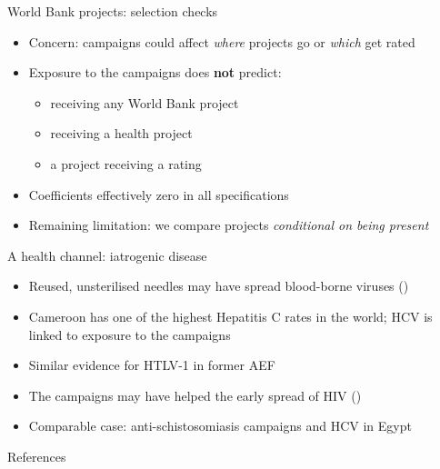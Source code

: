 \documentclass[aspectratio=1610]{beamer}
\newcommand{\refs}[1]{{\footnotesize\color{softgray}(\citealp{#1})}} %
\newcommand{\returnbutton}[1]{\par\vfill\hfill\hyperlink{#1}{\beamerreturnbutton{Back}}}
\begin{document}
\begin{frame}[label=bk-wb]{World Bank projects: selection checks}
  \begin{itemize}
    \item Concern: campaigns could affect \emph{where} projects go or \emph{which} get rated
    \item Exposure to the campaigns does \textbf{not} predict:
      \begin{itemize}
        \item receiving any World Bank project
        \item receiving a health project
        \item a project receiving a rating
      \end{itemize}
    \item Coefficients effectively zero in all specifications
    \item Remaining limitation: we compare projects \emph{conditional on being present}
  \end{itemize}
  \returnbutton{main-wb}
\end{frame}

\begin{frame}[label=bk-iatrogenic]{A health channel: iatrogenic disease}
  \begin{itemize}
    \item Reused, unsterilised needles may have spread blood-borne viruses \refs{pepin_labbe_2008}
    \item Cameroon has one of the highest Hepatitis C rates in the world;
      HCV is linked to exposure to the campaigns
    \item Similar evidence for HTLV-1 in former AEF
    \item The campaigns may have helped the early spread of HIV \refs{pepin_2011}
    \item Comparable case: anti-schistosomiasis campaigns and HCV in Egypt
  \end{itemize}
  \returnbutton{main-memory}
\end{frame}

\begin{frame}[allowframebreaks]{References}
  \scriptsize
  
  
\end{frame}
\end{document}
